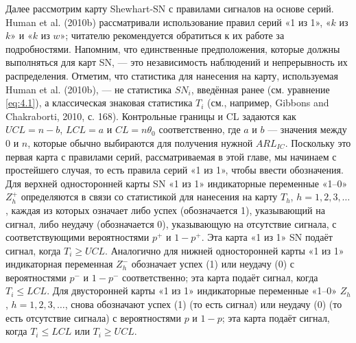 Далее рассмотрим карту Shewhart-SN с правилами сигналов на основе серий. Human et al. (2010b) рассматривали использование правил серий «1 из 1», «\(k\) из \(k\)» и «\(k\) из \(w\)»; читателю рекомендуется обратиться к их работе за подробностями. Напомним, что единственные предположения, которые должны выполняться для карт SN, --- это независимость наблюдений и непрерывность их распределения. Отметим, что статистика для нанесения на карту, используемая Human et al. (2010b), --- не статистика \(SN_i\), введённая ранее (см. уравнение \eqref{eq:4.1}), а классическая знаковая статистика \(T_i\) (см., например, Gibbons and Chakraborti, 2010, с. 168). Контрольные границы и CL задаются как \(UCL = n - b\), \(LCL = a\) и \(CL = n\theta_0\) соответственно, где \(a\) и \(b\) --- значения между 0 и \(n\), которые обычно выбираются для получения нужной \(ARL_{IC}\). Поскольку это первая карта с правилами серий, рассматриваемая в этой главе, мы начинаем с простейшего случая, то есть правила серий «1 из 1», чтобы ввести обозначения. Для верхней односторонней карты SN «1 из 1» индикаторные переменные «1--0» \(Z_h^+\) определяются в связи со статистикой для нанесения на карту \(T_h\), \(h = 1, 2, 3, \ldots\), каждая из которых означает либо успех (обозначается 1), указывающий на сигнал, либо неудачу (обозначается 0), указывающую на отсутствие сигнала, с соответствующими вероятностями \(p^+\) и \(1 - p^+\). Эта карта «1 из 1» SN подаёт сигнал, когда \(T_i \ge UCL\). Аналогично для нижней односторонней карты «1 из 1» индикаторная переменная \(Z_h^-\) обозначает успех (1) или неудачу (0) с вероятностями \(p^-\) и \(1 - p^-\) соответственно; эта карта подаёт сигнал, когда \(T_i \le LCL\). Для двусторонней карты «1 из 1» индикаторные переменные «1--0» \(Z_h\), \(h = 1, 2, 3, \ldots\), снова обозначают успех (1) (то есть сигнал) или неудачу (0) (то есть отсутствие сигнала) с вероятностями \(p\) и \(1 - p\); эта карта подаёт сигнал, когда \(T_i \le LCL\) или \(T_i \ge UCL\).

